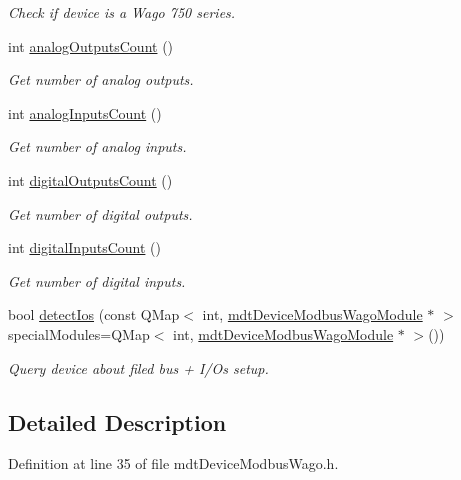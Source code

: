 \begin{DoxyCompactItemize}
\begin{DoxyCompactList}\small\item\em Check if device is a Wago 750 series. \end{DoxyCompactList}\item 
int \hyperlink{classmdt_device_modbus_wago_ad812b7ee3a2f2677cddde205da5ec787}{analogOutputsCount} ()
\begin{DoxyCompactList}\small\item\em Get number of analog outputs. \end{DoxyCompactList}\item 
int \hyperlink{classmdt_device_modbus_wago_a9da56c13404fd9243c5920ff2ef8bd15}{analogInputsCount} ()
\begin{DoxyCompactList}\small\item\em Get number of analog inputs. \end{DoxyCompactList}\item 
int \hyperlink{classmdt_device_modbus_wago_a6711c4e486c3b103b187102685e091cc}{digitalOutputsCount} ()
\begin{DoxyCompactList}\small\item\em Get number of digital outputs. \end{DoxyCompactList}\item 
int \hyperlink{classmdt_device_modbus_wago_ad51fd45858e62c597ba8fc2bf3e877bd}{digitalInputsCount} ()
\begin{DoxyCompactList}\small\item\em Get number of digital inputs. \end{DoxyCompactList}\item 
bool \hyperlink{classmdt_device_modbus_wago_aae46b00317190b70a59080e9b2917ed6}{detectIos} (const QMap$<$ int, \hyperlink{classmdt_device_modbus_wago_module}{mdtDeviceModbusWagoModule} $\ast$ $>$ specialModules=QMap$<$ int, \hyperlink{classmdt_device_modbus_wago_module}{mdtDeviceModbusWagoModule} $\ast$ $>$())
\begin{DoxyCompactList}\small\item\em Query device about filed bus + I/Os setup. \end{DoxyCompactList}\end{DoxyCompactItemize}


\subsection{Detailed Description}


Definition at line 35 of file mdtDeviceModbusWago.h.



